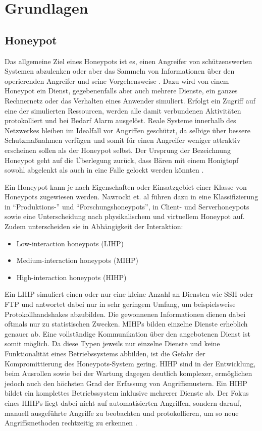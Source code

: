 \chapter{Grundlagen}
\label{ch:Grundlagen}


\section{Honeypot}
\label{sec:Honeypot}

Das allgemeine Ziel eines Honeypots ist es, einen Angreifer von schützenswerten Systemen abzulenken oder aber das Sammeln von Informationen über den operierenden Angreifer und seine Vorgehensweise \cite{NawrockiWSKS16}. Dazu wird von einem Honeypot ein Dienst, gegebenenfalls aber auch mehrere Dienste, ein ganzes Rechnernetz oder das Verhalten eines Anwender simuliert. Erfolgt ein Zugriff auf eine der simulierten Ressourcen, werden alle damit verbundenen Aktivitäten protokolliert und bei Bedarf Alarm ausgelöst. Reale Systeme innerhalb des Netzwerkes bleiben im Idealfall vor Angriffen geschützt, da selbige über bessere Schutzmaßnahmen verfügen und somit für einen Angreifer weniger attraktiv erscheinen sollen als der Honeypot selbst. Der Ursprung der Bezeichnung Honeypot geht auf die Überlegung zurück, dass Bären mit einem Honigtopf sowohl abgelenkt als auch in eine Falle gelockt werden könnten \cite{WikiHoney16}.


Ein Honeypot kann je nach Eigenschaften oder Einsatzgebiet einer Klasse von Honeypots zugewiesen werden. Nawrocki et. al führen dazu in \cite{NawrockiWSKS16} eine Klassifizierung in "`Produktions-"' und "`Forschungshoneypots"', in Client- und Serverhoneypots sowie eine Unterscheidung nach physikalischem und virtuellem Honeypot auf. Zudem unterscheiden sie in Abhängigkeit der Interaktion:

\begin{itemize}
\item Low-interaction honeypots (LIHP)
\item Medium-interaction honeypots (MIHP)
\item High-interaction honeypots (HIHP)
\end{itemize}

Ein LIHP simuliert einen oder nur eine kleine Anzahl an Diensten wie SSH oder FTP und antwortet dabei nur in sehr geringem Umfang, um beispielsweise Protokollhandshakes abzubilden. Die gewonnenen Informationen dienen dabei oftmals nur zu statistischen Zwecken.
MIHPs bilden einzelne Dienste erheblich genauer ab. Eine vollständige Kommunikation über den angebotenen Dienst ist somit möglich. Da diese Typen jeweils nur einzelne Dienste und keine Funktionalität eines Betriebssystems abbilden, ist die Gefahr der Kompromittierung des Honeypots-System gering. HIHP sind in der Entwicklung, beim Ausrollen sowie bei der Wartung dagegen deutlich komplexer, ermöglichen jedoch auch den höchsten Grad der Erfassung von Angriffsmustern. Ein HIHP bildet ein komplettes Betriebssystem inklusive mehrerer Dienste ab. Der Fokus eines HIHPs liegt dabei nicht auf automatisierten Angriffen, sondern darauf, manuell ausgeführte Angriffe zu beobachten und protokollieren, um so neue Angriffsmethoden rechtzeitig zu erkennen \cite{WikiHoney16}.\\


